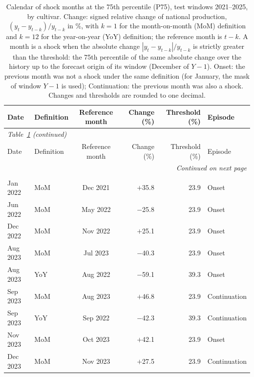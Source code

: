 \begin{longtable}{llcrrl}
\caption{Calendar of shock months at the 75th percentile (P75), test windows 2021--2025, by cultivar. Change: signed relative change of national production, $(y_t - y_{t-k})/y_{t-k}$ in \%, with $k = 1$ for the month-on-month (MoM) definition and $k = 12$ for the year-on-year (YoY) definition; the reference month is $t-k$. A month is a shock when the absolute change $|y_t - y_{t-k}|/y_{t-k}$ is strictly greater than the threshold: the 75th percentile of the same absolute change over the history up to the forecast origin of its window (December of $Y-1$). Onset: the previous month was not a shock under the same definition (for January, the mask of window $Y-1$ is used); Continuation: the previous month was also a shock. Changes and thresholds are rounded to one decimal.}\label{tab:shock_calendar}\\
\toprule
Date & Definition & Reference month & Change (\%) & Threshold (\%) & Episode \\
\midrule
\endfirsthead
\multicolumn{6}{l}{\small\itshape Table~\ref{tab:shock_calendar} (continued)}\\
\toprule
Date & Definition & Reference month & Change (\%) & Threshold (\%) & Episode \\
\midrule
\endhead
\midrule \multicolumn{6}{r}{\small\itshape Continued on next page}\\
\endfoot
\bottomrule
\endlastfoot
\multicolumn{6}{l}{\textbf{Sour lime} (20 shock months: MoM 10, YoY 10)}\\
\midrule
Jan 2022 & MoM & Dec 2021 & $+$35.8 & 23.9 & Onset \\
Jun 2022 & MoM & May 2022 & $-$25.8 & 23.9 & Onset \\
Dec 2022 & MoM & Nov 2022 & $+$25.1 & 23.9 & Onset \\
Aug 2023 & MoM & Jul 2023 & $-$40.3 & 23.9 & Onset \\
Aug 2023 & YoY & Aug 2022 & $-$59.1 & 39.3 & Onset \\
Sep 2023 & MoM & Aug 2023 & $+$46.8 & 23.9 & Continuation \\
Sep 2023 & YoY & Sep 2022 & $-$42.3 & 39.3 & Continuation \\
Nov 2023 & MoM & Oct 2023 & $+$42.1 & 23.9 & Onset \\
Dec 2023 & MoM & Nov 2023 & $+$27.5 & 23.9 & Continuation \\

\end{longtable}

